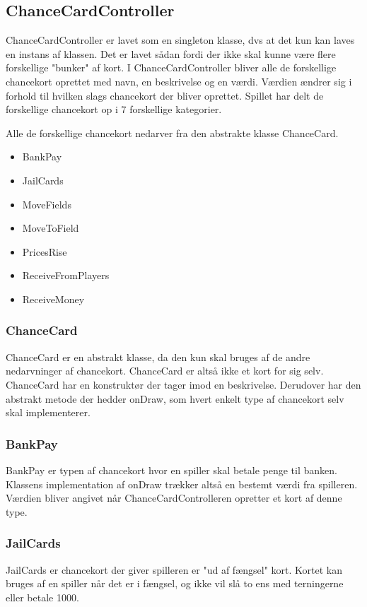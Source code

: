 \subsection{ChanceCardController}
ChanceCardController er lavet som en singleton klasse, dvs at det kun kan laves en instans af klassen. Det er lavet sådan fordi der ikke skal kunne være flere forskellige "bunker" af kort. 
I ChanceCardController bliver alle de forskellige chancekort oprettet med navn, en beskrivelse og en værdi. Værdien ændrer sig i forhold til hvilken slags chancekort der bliver oprettet. Spillet har delt de forskellige chancekort op i 7 forskellige kategorier.

Alle de forskellige chancekort nedarver fra den abstrakte klasse ChanceCard.

\begin{itemize}
    \item BankPay
    \item JailCards
    \item MoveFields
    \item MoveToField
    \item PricesRise
    \item ReceiveFromPlayers
    \item ReceiveMoney
\end{itemize}

\subsubsection{ChanceCard}
ChanceCard er en abstrakt klasse, da den kun skal bruges af de andre nedarvninger af chancekort. ChanceCard er altså ikke et kort for sig selv. ChanceCard har en konstruktør der tager imod en beskrivelse. Derudover har den abstrakt metode der hedder onDraw, som hvert enkelt type af chancekort selv skal implementerer.

\subsubsection{BankPay}
BankPay er typen af chancekort hvor en spiller skal betale penge til banken. Klassens implementation af onDraw trækker altså en bestemt værdi fra spilleren. Værdien bliver angivet når ChanceCardControlleren opretter et kort af denne type.

\subsubsection{JailCards}
JailCards er chancekort der giver spilleren er "ud af fængsel" kort. Kortet kan bruges af en spiller når det er i fængsel, og ikke vil slå to ens med terningerne eller betale 1000.

